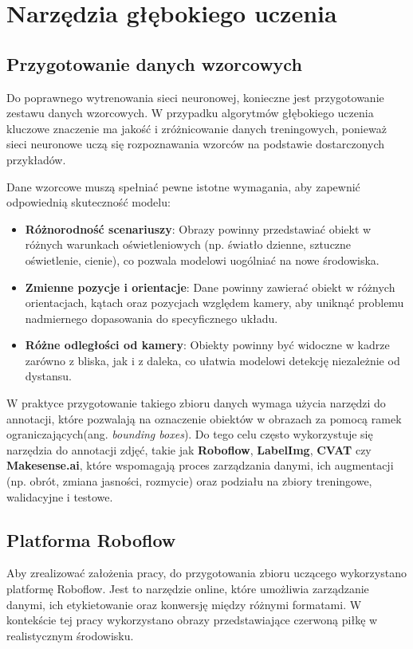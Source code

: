 \documentclass[a4paper,twoside,12pt]{book}
\begin{document}
\section{Narzędzia głębokiego uczenia}
\subsection{Przygotowanie danych wzorcowych}
Do poprawnego wytrenowania sieci neuronowej, konieczne jest przygotowanie zestawu danych wzorcowych. W przypadku algorytmów głębokiego uczenia kluczowe znaczenie ma jakość i zróżnicowanie danych treningowych, ponieważ sieci neuronowe uczą się rozpoznawania wzorców na podstawie dostarczonych przykładów. 

Dane wzorcowe muszą spełniać pewne istotne wymagania, aby zapewnić odpowiednią skuteczność modelu:
\begin{itemize}
    \item \textbf{Różnorodność scenariuszy}: Obrazy powinny przedstawiać obiekt w różnych warunkach oświetleniowych (np. światło dzienne, sztuczne oświetlenie, cienie), co pozwala modelowi uogólniać na nowe środowiska.
    \item \textbf{Zmienne pozycje i orientacje}: Dane powinny zawierać obiekt w różnych orientacjach, kątach oraz pozycjach względem kamery, aby uniknąć problemu nadmiernego dopasowania do specyficznego układu.
    \item \textbf{Różne odległości od kamery}: Obiekty powinny być widoczne w kadrze zarówno z bliska, jak i z daleka, co ułatwia modelowi detekcję niezależnie od dystansu.
\end{itemize}

W praktyce przygotowanie takiego zbioru danych wymaga użycia narzędzi do annotacji, które pozwalają na oznaczenie obiektów w obrazach za pomocą ramek ograniczających(ang. \textit{bounding boxes}). Do tego celu często wykorzystuje się narzędzia do annotacji zdjęć, takie jak \textbf{Roboflow}, \textbf{LabelImg}, \textbf{CVAT} czy \textbf{Makesense.ai}, które wspomagają proces zarządzania danymi, ich augmentacji (np. obrót, zmiana jasności, rozmycie) oraz podziału na zbiory treningowe, walidacyjne i testowe. 



\subsection{Platforma Roboflow}
Aby zrealizować założenia pracy, do przygotowania zbioru uczącego wykorzystano platformę Roboflow. Jest to narzędzie online, które umożliwia zarządzanie danymi, ich etykietowanie oraz konwersję między różnymi formatami. W kontekście tej pracy wykorzystano obrazy przedstawiające czerwoną piłkę w realistycznym środowisku.
\end{document}
